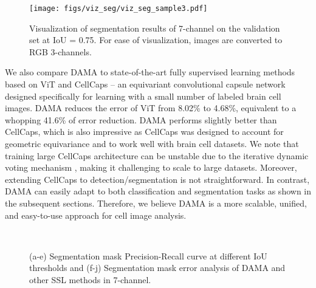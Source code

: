 \documentclass[10pt,twocolumn,letterpaper]{article}
\begin{document}
\begin{figure*}[]
\centering
\texttt{[image: figs/viz\_seg/viz\_seg\_sample3.pdf]}
\caption{Visualization of segmentation results of 7-channel on the validation set at IoU = 0.75. For ease of visualization, images are converted to RGB 3-channels.}\label{fig:vizsegsample}
\vspace{-5pt}
\end{figure*}


We also compare DAMA to state-of-the-art fully supervised learning methods based on ViT and CellCaps \cite{maric2021whole} -- an equivariant convolutional capsule network designed specifically for learning with a small number of labeled brain cell images. DAMA reduces the error of ViT from 8.02\% to 4.68\%, equivalent to a whopping 41.6\% of error reduction. DAMA performs slightly better than CellCaps, which is also impressive as CellCaps was designed to account for geometric equivariance and to work well with brain cell datasets. We note that training large CellCaps architecture can be unstable due to the iterative dynamic voting mechanism \cite{sabour2017dynamic}, making it challenging to scale to large datasets. Moreover, extending CellCaps to detection/segmentation is not straightforward. In contrast, DAMA can easily adapt to both classification and segmentation tasks as shown in the subsequent sections. Therefore, we believe DAMA is a more scalable, unified, and easy-to-use approach for cell image analysis.

\begin{figure*}[t]
\centering
{}\hfill {}\hfill {}\hfill {}\hfill {}\\\hfill {}\hfill {}\hfill {}\hfill {}\caption{(a-e) Segmentation mask Precision-Recall curve at different IoU thresholds and (f-j) Segmentation mask error analysis of DAMA and other SSL methods in 7-channel.} \label{fig:segprecall}
\end{figure*}
\end{document}
